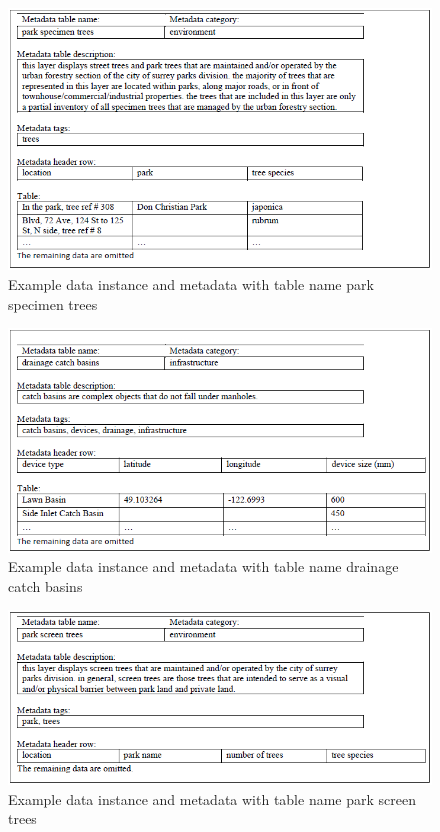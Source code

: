 \begin{figure}
    \centering
    \includegraphics[width=5in]{figures/example-park-specimen-trees.png}
    \caption{Example data instance and metadata with table name park specimen trees}
    \label{fig:example-park-specimen-trees}
\end{figure}

\begin{figure}
    \centering
    \includegraphics[width=5in]{figures/example-drainage-catch-basins.png}
    \caption{Example data instance and metadata with table name drainage catch basins}
    \label{fig:example-drainage-catch-basins}
\end{figure}

\begin{figure}
    \centering
    \includegraphics[width=5in]{figures/example-park-screen-trees.png}
    \caption{Example data instance and metadata with table name park screen trees}
    \label{fig:example-park-screen-trees}
\end{figure}

